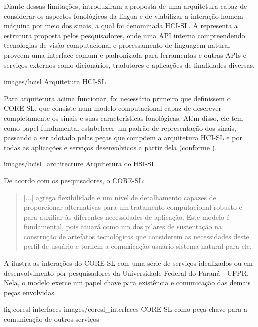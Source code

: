 Diante dessas limitações, \textcite{antunes-hcisl-2011} introduziram a proposta de uma arquitetura capaz de considerar os aspectos fonológicos da língua e de viabilizar a interação homem-máquina por meio dos sinais, a qual foi denominada HCI-SL. A  representa a estrutura proposta pelos pesquisadores, onde uma API interna compreendendo tecnologias de visão computacional e processamento de linguagem natural proveem uma interface comum e padronizada para ferramentas e outras APIs e serviços externos como dicionários, tradutores e aplicações de finalidades diversas.

    {images/hcisl}
    {Arquitetura HCI-SL \cite{antunes-hcisl-2011}}

Para arquitetura acima funcionar, foi necessário primeiro que \textcite{antunes-hcisl-2011} definissem o CORE-SL, que consiste num modelo computacional capaz de descrever completamente os sinais e suas características fonológicas. Além disso, ele tem como papel fundamental estabelecer um padrão de representação dos sinais, passando a ser adotado pelas peças que compõem a arquitetura HCI-SL e por todas as aplicações e serviços desenvolvidos a partir dela (conforme ). 
 
    {images/hcisl_architecture}
    {Arquitetura do HSI-SL}

De acordo com os pesquisadores, o CORE-SL:

\begin{quote}
[...] agrega flexibilidade e um nível de detalhamento capazes de proporcionar alternativas para um tratamento computacional robusto e para auxiliar às diferentes necessidades de aplicação. Este modelo é fundamental, pois atuará como um dos pilares de sustentação na construção de artefatos tecnológicos que considerem as necessidades deste perfil de usuário e tornem a comunicação usuário-sistema natural para ele. \cite{antunes-2011}
\end{quote}

 A  ilustra as interações do CORE-SL com uma série de serviços idealizados ou em desenvolvimento por pesquisadores da Universidade Federal do Paraná - UFPR. Nela, o modelo exerce um papel chave para existência e comunicação das demais peças envolvidas.

\image
    {fig:coresl-interfaces}
    {images/coresl_interfaces}
    {CORE-SL como peça chave para a comunicação de outros serviços}

